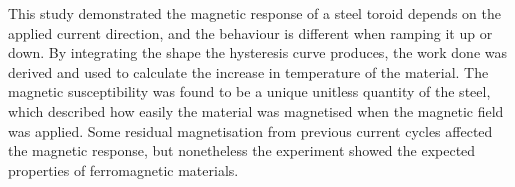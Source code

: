
This study demonstrated the magnetic response of a steel toroid depends on the applied current direction, and the
behaviour is different when ramping it up or down.
By integrating the shape the hysteresis curve produces, the work done was derived and used to calculate the increase
in temperature of the material.
The magnetic susceptibility was found to be a unique unitless quantity of the steel, which described how easily the
material was magnetised when the magnetic field was applied.
Some residual magnetisation from previous current cycles affected the magnetic response, but nonetheless the
experiment showed the expected properties of ferromagnetic materials.
